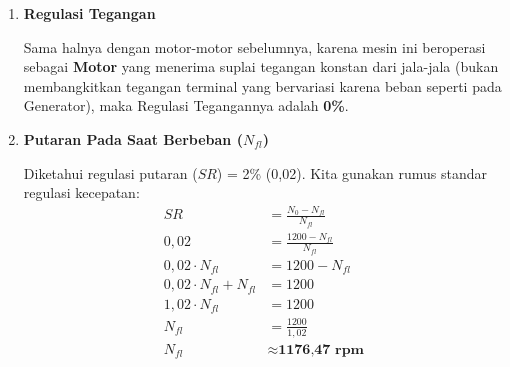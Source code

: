 \documentclass[12pt, a4paper]{article}
\begin{document}
\begin{enumerate}[label=\alph*.]
    Selanjutnya, menghitung Daya Motor (Daya Mekanik / \textit{Developed Power}, $P_{dev}$):
    \[
        P_{dev} = E_a \cdot I_a = 244 \cdot 6 = 1464 \text{ Watt}
    \]
    \textit{(Catatan: Karena rugi rotasi/mekanik tidak diketahui, kita asumsikan Daya Output ($P_{out}$) sama dengan $P_{dev}$ yaitu 1464 Watt).}

    Menghitung Efisiensi ($\eta$) berdasarkan total daya yang ditarik motor dari kedua sumber:
    \begin{align*}
        \eta &= \left( \frac{P_{out}}{P_{in\_total}} \right) \times 100\% \\
        \eta &= \left( \frac{1464}{1800} \right) \times 100\% \\
        \eta &\approx 0,8133 \times 100\% \approx \textbf{81,33\%}
    \end{align*}

    \vspace{0.3cm}

    \item \textbf{Regulasi Tegangan}

    Sama halnya dengan motor-motor sebelumnya, karena mesin ini beroperasi sebagai \textbf{Motor} yang menerima suplai tegangan konstan dari jala-jala (bukan membangkitkan tegangan terminal yang bervariasi karena beban seperti pada Generator), maka Regulasi Tegangannya adalah \textbf{0\%}.

    \vspace{0.3cm}

    \item \textbf{Putaran Pada Saat Berbeban ($N_{fl}$)}

    Diketahui regulasi putaran ($SR$) = 2\% (0,02). Kita gunakan rumus standar regulasi kecepatan:
    \begin{align*}
        SR &= \frac{N_0 - N_{fl}}{N_{fl}} \\
        0,02 &= \frac{1200 - N_{fl}}{N_{fl}} \\
        0,02 \cdot N_{fl} &= 1200 - N_{fl} \\
        0,02 \cdot N_{fl} + N_{fl} &= 1200 \\
        1,02 \cdot N_{fl} &= 1200 \\
        N_{fl} &= \frac{1200}{1,02} \\
        N_{fl} &\approx \textbf{1176,47 rpm}
    \end{align*}
\end{enumerate}
\end{document}
